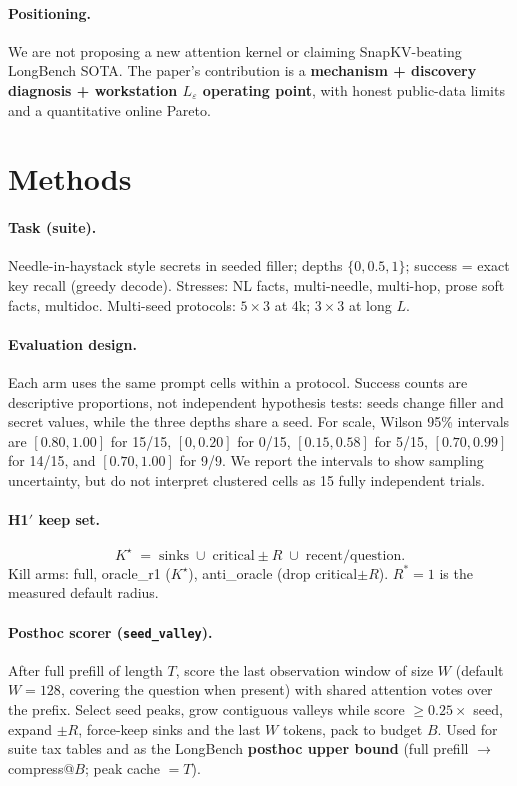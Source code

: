 \documentclass[11pt,a4paper]{article}
\begin{document}
\paragraph{Positioning.}
We are not proposing a new attention kernel or claiming SnapKV-beating LongBench SOTA. The paper's contribution is a \textbf{mechanism + discovery diagnosis + workstation $L_\varepsilon$ operating point}, with honest public-data limits and a quantitative online Pareto.

\section{Methods}
\label{sec:methods}

\paragraph{Task (suite).}
Needle-in-haystack style secrets in seeded filler; depths $\{0,0.5,1\}$; success = exact key recall (greedy decode). Stresses: NL facts, multi-needle, multi-hop, prose soft facts, multidoc. Multi-seed protocols: $5\times3$ at 4k; $3\times3$ at long $L$.

\paragraph{Evaluation design.}
Each arm uses the same prompt cells within a protocol. Success counts are descriptive proportions, not independent hypothesis tests: seeds change filler and secret values, while the three depths share a seed. For scale, Wilson 95\% intervals are $[0.80,1.00]$ for 15/15, $[0,0.20]$ for 0/15, $[0.15,0.58]$ for 5/15, $[0.70,0.99]$ for 14/15, and $[0.70,1.00]$ for 9/9. We report the intervals to show sampling uncertainty, but do not interpret clustered cells as 15 fully independent trials.

\paragraph{H1$'$ keep set.}
\[
K^\star \;=\; \mathrm{sinks} \;\cup\; \mathrm{critical}\pm R \;\cup\; \mathrm{recent/question}.
\]
Kill arms: full, oracle\_r1 ($K^\star$), anti\_oracle (drop critical$\pm R$). $R^*=1$ is the measured default radius.

\paragraph{Posthoc scorer (\texttt{seed\_valley}).}
After full prefill of length $T$, score the last observation window of size $W$ (default $W{=}128$, covering the question when present) with shared attention votes over the prefix. Select seed peaks, grow contiguous valleys while score $\ge 0.25\times$ seed, expand $\pm R$, force-keep sinks and the last $W$ tokens, pack to budget $B$. Used for suite tax tables and as the LongBench \textbf{posthoc upper bound} (full prefill $\to$ compress@$B$; peak cache $=T$).
\end{document}
